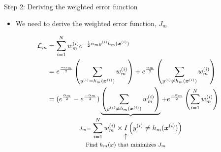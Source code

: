 \documentclass[serif, aspectratio=169]{beamer}
\makeatletter
\newcommand\vertarrowbox[3][6ex]{%
  \begin{array}[t]{@{}c@{}} #2 \\
  \left\uparrow\vcenter{\hrule height #1}\right.\kern-\nulldelimiterspace\\
  \makebox[0pt]{\scriptsize#3}
  \end{array}%
}
\makeatother
\begin{document}

\begin{frame}{Step 2: Deriving the weighted error function}
    \begin{itemize}
        \itemsep1em
        \justifying
        \item We need to derive the weighted error function, $J_m$
    \end{itemize}
    \begin{align*}
        \mathcal{L}_m &= \displaystyle\sum_{i=1}^N w_m^{(i)} e^{-\frac{1}{2}\alpha_my^{(i)}h_m(\boldsymbol{x}^{(i)})} \\
        &= e^{\frac{-\alpha_m}{2}} \left( \displaystyle\sum_{y^{(i)}=h_m(\boldsymbol{x}^{(i)})} w_m^{(i)} \right) + e^{\frac{\alpha_m}{2}} \left( \displaystyle\sum_{y^{(i)}\neq h_m(\boldsymbol{x}^{(i)})} w_m^{(i)} \right) \\
        &= (e^{\frac{\alpha_m}{2}}-e^{\frac{-\alpha_m}{2}}) \underbrace{\left(\displaystyle\sum_{y^{(i)}\neq h_m(\boldsymbol{x}^{(i)})} w_m^{(i)}\right)}_{\mathclap{J_m=\displaystyle\sum_{i=1}^Nw_m^{(i)} \times 
        \text{\vertarrowbox[2ex]{I}{\footnotesize Find $h_m(\boldsymbol{x})$ that minimizes $J_m$}}
        \left(y^{(i)} \neq h_m(\boldsymbol{x}^{(i)})\right)}} + e^{\frac{-\alpha_m}{2}} \left(\displaystyle\sum_{i=1}^Nw_m^{(i)}\right)
    \end{align*}
\end{frame}
\end{document}
